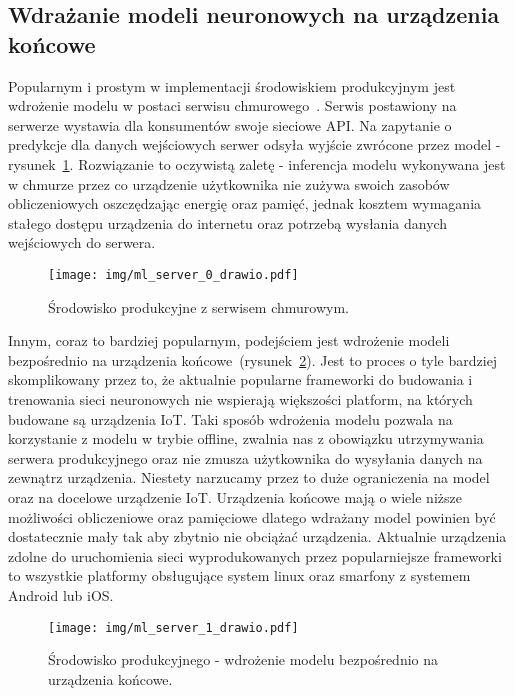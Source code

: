 \subsection{Wdrażanie modeli neuronowych na urządzenia końcowe}

Popularnym i prostym w implementacji środowiskiem produkcyjnym jest wdrożenie modelu w postaci
serwisu chmurowego~\cite{ServerFacebook}. Serwis postawiony na serwerze wystawia dla konsumentów
swoje sieciowe API. Na zapytanie o predykcje dla danych wejściowych serwer odsyła wyjście
zwrócone przez model - rysunek~\ref{fig:deploy-0}. Rozwiązanie to oczywistą zaletę - inferencja
modelu wykonywana jest w chmurze przez co urządzenie użytkownika nie zużywa swoich zasobów obliczeniowych oszczędzając energię oraz pamięć, jednak kosztem wymagania stałego dostępu urządzenia do internetu oraz potrzebą wysłania danych wejściowych do serwera.

\begin{figure}[h!]
    \centering
    \texttt{[image: img/ml\_server\_0\_drawio.pdf]}
    \caption{Środowisko produkcyjne z serwisem chmurowym.}
    \label{fig:deploy-0}
    \vspace{-4mm}
\end{figure}

Innym, coraz to bardziej popularnym, podejściem jest wdrożenie modeli bezpośrednio na urządzenia
końcowe~\cite{EdgeFacebook}(rysunek~\ref{fig:deploy-1}). Jest to proces o tyle bardziej
skomplikowany przez to, że aktualnie popularne frameworki\cite{PyTorch,Tensorflow,Mxnet} do
budowania i trenowania sieci neuronowych nie wspierają większości platform, na których budowane
są urządzenia IoT. Taki sposób wdrożenia modelu pozwala na korzystanie z modelu w trybie offline,
zwalnia nas z obowiązku utrzymywania serwera produkcyjnego oraz nie zmusza użytkownika do
wysyłania danych na zewnątrz urządzenia. Niestety narzucamy przez to duże ograniczenia na model
oraz na docelowe urządzenie IoT. Urządzenia końcowe mają o wiele niższe możliwości obliczeniowe
oraz pamięciowe dlatego wdrażany model powinien być dostatecznie mały tak aby zbytnio nie
obciążać urządzenia. Aktualnie urządzenia zdolne do uruchomienia sieci wyprodukowanych przez
popularniejsze frameworki to wszystkie platformy obsługujące system linux oraz smarfony z
systemem Android lub iOS.

\begin{figure}[h!]
    \centering
    \texttt{[image: img/ml\_server\_1\_drawio.pdf]}
    \caption{Środowisko produkcyjnego - wdrożenie modelu bezpośrednio na urządzenia końcowe.}
    \label{fig:deploy-1}
    \vspace{-4mm}
\end{figure}

